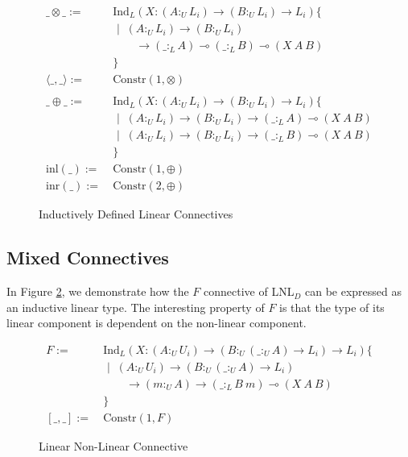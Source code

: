 \documentclass[sigplan,screen,review,anonymous]{acmart}
\newcommand{\ind}[1]{\text{Ind}_{#1}}
\newcommand{\constr}{\text{Constr}}
\newcommand{\sep}{\text{ | }}
\newcommand{\utype}{:_{\scriptscriptstyle U}}
\newcommand{\ltype}{:_{\scriptscriptstyle L}}
\newcommand{\lrangle}[1]{\langle #1 \rangle}
\newcommand{\inl}{\text{inl}}
\newcommand{\inr}{\text{inr}}
\begin{document}
\begin{figure}[h]
  \caption{Inductively Defined Linear Connectives}
  \begin{align*}
    \_\otimes\_ :=\
     & \ind{L}(X : (A \utype L_i) \rightarrow (B \utype L_i) \rightarrow L_i)\{      \\
     & \sep\ (A \utype L_i) \rightarrow (B \utype L_i)                               \\
     & \qquad \rightarrow (\_ \ltype A)  \multimap (\_ \ltype B) \multimap (X\ A\ B) \\
     & \}
    \\
    \lrangle{\_,\_} := \
     & \constr(1, \otimes)
    \\\\
    \_\oplus\_ := \
     & \ind{L}(X : (A \utype L_i) \rightarrow (B \utype L_i) \rightarrow L_i)\{      \\
     & \sep \ (A \utype L_i) \rightarrow (B \utype L_i)
    \rightarrow (\_ \ltype A)  \multimap (X\ A\ B)                                   \\
     & \sep \ (A \utype L_i) \rightarrow (B \utype L_i)
    \rightarrow (\_ \ltype B)  \multimap (X\ A\ B)                                   \\
     & \}
    \\
    \inl(\_) := \
     & \constr(1, \oplus)
    \\
    \inr(\_) := \
     & \constr(2, \oplus)
  \end{align*}
  \Description{}
  \label{lconnectives}
\end{figure}

\subsection{Mixed Connectives}
In Figure \ref{mconnectives}, we demonstrate how the $F$ connective of LNL$_D$ \cite{neel15} can be expressed as an inductive linear type. The interesting property of $F$ is that the type of its linear component is dependent on the non-linear component.

\begin{figure}[h]
  \caption{Linear Non-Linear Connective}
  \begin{align*}
    F := \
     & \ind{L}(X : (A \utype U_i) \rightarrow
    (B \utype (\_ \utype A) \rightarrow L_i) \rightarrow L_i)\{ \\
     & \sep \ (A \utype U_i) \rightarrow
    (B \utype (\_ \utype A) \rightarrow L_i)                    \\
     & \qquad \rightarrow (m \utype A) \rightarrow
    (\_ \ltype B\ m) \multimap (X\ A\ B)                        \\
     & \}
    \\
    [\_,\_] :=\
     & \constr(1, F)
  \end{align*}
  \Description{}
  \label{mconnectives}
\end{figure}
\end{document}
